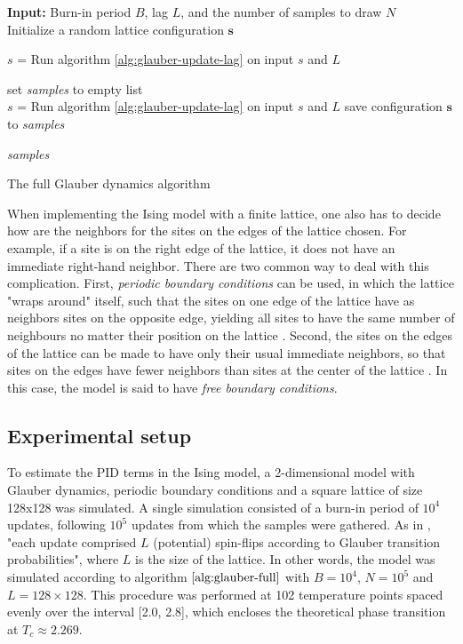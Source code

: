 \documentclass[12pt]{article}
\begin{document}
\begin{algorithm}
\textbf{Input:} Burn-in period $B$, lag $L$, and the number of samples to draw $N$ \\ 
Initialize a random lattice configuration $\boldsymbol{s}$\;

 {  
	$s$ = Run algorithm \ref{alg:glauber-update-lag} on input $s$ and $L$\;
}

set \textit{samples} to empty list  \\
 {
	$s$ = Run algorithm \ref{alg:glauber-update-lag} on input $s$ and $L$\;
	save configuration $\boldsymbol{s}$ to \textit{samples}\;
}

\Return \textit{samples}
\caption{The full Glauber dynamics algorithm}
\label{alg:glauber-full}
\end{algorithm}

When implementing the Ising model with a finite lattice, one also has to decide how are the neighbors for the sites on the edges of the lattice chosen. For example, if a site is on the right edge of the lattice, it does not have an immediate right-hand neighbor. There are two common way to deal with this complication. First, \textit{periodic boundary conditions} can be used, in which the lattice "wraps around" itself, such that the sites on one edge of the lattice have as neighbors sites on the opposite edge, yielding all sites to have the same number of neighbours no matter their position on the lattice \cite{spin-models-thesis}. Second, the sites on the edges of the lattice can be made to have only their usual immediate neighbors, so that sites on the edges have fewer neighbors than sites at the center of the lattice \cite{spin-models-thesis}. In this case, the model is said to have \textit{free boundary conditions}.

\subsection{Experimental setup}

To estimate the PID terms in the Ising model, a 2-dimensional model with Glauber dynamics, periodic boundary conditions and a square lattice of size 128x128 was simulated. A single simulation consisted of a burn-in period of $10^4$ updates, following $10^5$ updates from which the samples were gathered. As in \cite{barnett-ising}, "each update comprised $L$ (potential) spin-flips according to Glauber transition probabilities", where $L$ is the size of the lattice. In other words, the model was simulated according to algorithm $\ref{alg:glauber-full}$ with $B=10^4$, $N=10^5$ and $L=128\times128$. This procedure was performed at 102 temperature points spaced evenly over the interval [2.0, 2.8], which encloses the theoretical phase transition at $T_c \approx 2.269$. 
\end{document}
